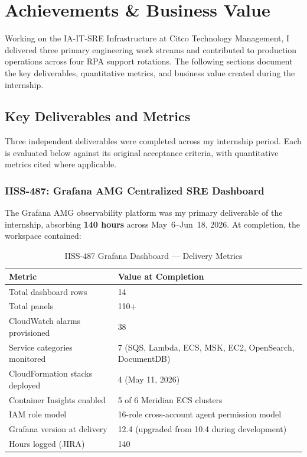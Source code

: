 
\chapter{Achievements \& Business Value}
\label{chap:achievements}

Working on the IA-IT-SRE Infrastructure at Citco Technology Management,
I delivered three primary engineering work streams and contributed to
production operations across four RPA support rotations. The following
sections document the key deliverables, quantitative metrics, and
business value created during the internship.

\section{Key Deliverables and Metrics}
\label{sec:key_deliverables}

Three independent deliverables were completed across my internship period.
Each is evaluated below against its original acceptance criteria, with
quantitative metrics cited where applicable.

\subsection{IISS-487: Grafana AMG Centralized SRE Dashboard}

The Grafana AMG observability platform was my primary deliverable of the
internship, absorbing \textbf{140 hours} across May~6--Jun~18, 2026. At
completion, the workspace contained:

\begin{table}[ht]
\centering
\caption{IISS-487 Grafana Dashboard --- Delivery Metrics}
\label{tab:iiss487_metrics}
\begin{tabular}{p{6.5cm}p{5.5cm}}
\toprule
\textbf{Metric} & \textbf{Value at Completion} \\
\midrule
Total dashboard rows & 14 \\
Total panels & 110+ \\
CloudWatch alarms provisioned & 38 \\
Service categories monitored & 7 (SQS, Lambda, ECS, MSK, EC2, OpenSearch, DocumentDB) \\
CloudFormation stacks deployed & 4 (May 11, 2026) \\
Container Insights enabled & 5 of 6 Meridian ECS clusters \\
IAM role model & 16-role cross-account agent permission model \\
Grafana version at delivery & 12.4 (upgraded from 10.4 during development) \\
Hours logged (JIRA) & 140 \\
\bottomrule
\end{tabular}
\end{table}

